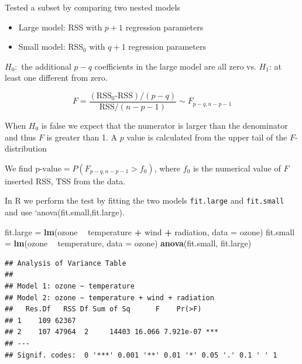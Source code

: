 \documentclass[10pt,ignorenonframetext,]{beamer}
\newenvironment{Shaded}{\begin{snugshade}}{\end{snugshade}}
\newcommand{\KeywordTok}[1]{\textcolor[rgb]{0.13,0.29,0.53}{\textbf{#1}}}
\newcommand{\DataTypeTok}[1]{\textcolor[rgb]{0.13,0.29,0.53}{#1}}
\newcommand{\StringTok}[1]{\textcolor[rgb]{0.31,0.60,0.02}{#1}}
\newcommand{\OperatorTok}[1]{\textcolor[rgb]{0.81,0.36,0.00}{\textbf{#1}}}
\newcommand{\NormalTok}[1]{#1}
\providecommand{\tightlist}{%
  \setlength{\itemsep}{0pt}\setlength{\parskip}{0pt}}
\begin{document}
\begin{frame}[fragile]

\begin{block}{Tested a subset by comparing two nested models}

\begin{itemize}
\tightlist
\item
  Large model: RSS with \(p+1\) regression parameters
\item
  Small model: RSS\(_0\) with \(q+1\) regression parameters
\end{itemize}

\(H_0:\) the additional \(p-q\) coefficients in the large model are all
zero vs. \(H_1\): at least one different from zero.

\[F=\frac{(\text{RSS$_0$-RSS})/(p-q)}{\text{RSS}/(n-p-1)} \sim F_{p-q,n-p-1}\]

When \(H_0\) is false we expect that the numerator is larger than the
denominator and thus \(F\) is greater than 1. A \(p\) value is
calculated from the upper tail of the \(F\)-distribution

We find \(\text{p-value}=P(F_{p-q,n-p-1}>f_0)\), where \(f_0\) is the
numerical value of \(F\) inserted RSS, TSS from the data.

In R we perform the test by fitting the two models \texttt{fit.large}
and \texttt{fit.small} and use `anova(fit.small,fit.large).

\end{block}

\end{frame}

\begin{frame}[fragile]

\footnotesize

\begin{Shaded}
\begin{Highlighting}[]
\NormalTok{fit.large =}\StringTok{ }\KeywordTok{lm}\NormalTok{(ozone }\OperatorTok{~}\StringTok{ }\NormalTok{temperature }\OperatorTok{+}\StringTok{ }\NormalTok{wind }\OperatorTok{+}\StringTok{ }\NormalTok{radiation, }\DataTypeTok{data =}\NormalTok{ ozone)}
\NormalTok{fit.small =}\StringTok{ }\KeywordTok{lm}\NormalTok{(ozone }\OperatorTok{~}\StringTok{ }\NormalTok{temperature, }\DataTypeTok{data =}\NormalTok{ ozone)}
\KeywordTok{anova}\NormalTok{(fit.small, fit.large)}
\end{Highlighting}
\end{Shaded}

\begin{verbatim}
## Analysis of Variance Table
## 
## Model 1: ozone ~ temperature
## Model 2: ozone ~ temperature + wind + radiation
##   Res.Df   RSS Df Sum of Sq      F    Pr(>F)    
## 1    109 62367                                  
## 2    107 47964  2     14403 16.066 7.921e-07 ***
## ---
## Signif. codes:  0 '***' 0.001 '**' 0.01 '*' 0.05 '.' 0.1 ' ' 1
\end{verbatim}

\normalsize

\end{frame}
\end{document}
